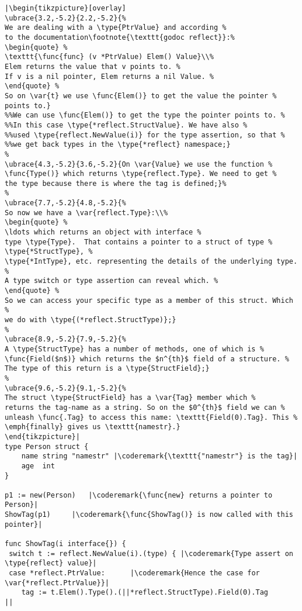 \begin{lstlisting}[caption=Introspection using reflection,label=src:introspection]
|\begin{tikzpicture}[overlay]
\ubrace{3.2,-5.2}{2.2,-5.2}{%
We are dealing with a \type{PtrValue} and according %
to the documentation\footnote{\texttt{godoc reflect}}:%
\begin{quote} %
\texttt{\func{func} (v *PtrValue) Elem() Value}\\%
Elem returns the value that v points to. %
If v is a nil pointer, Elem returns a nil Value. %
\end{quote} %
So on \var{t} we use \func{Elem()} to get the value the pointer %
points to.}
%%We can use \func{Elem()} to get the type the pointer points to. %
%%In this case \type{*reflect.StructValue}. We have also %
%%used \type{reflect.NewValue(i)} for the type assertion, so that %
%%we get back types in the \type{*reflect} namespace;}
%
\ubrace{4.3,-5.2}{3.6,-5.2}{On \var{Value} we use the function %
\func{Type()} which returns \type{reflect.Type}. We need to get %
the type because there is where the tag is defined;}%
%
\ubrace{7.7,-5.2}{4.8,-5.2}{%
So now we have a \var{reflect.Type}:\\%
\begin{quote} %
\ldots which returns an object with interface %
type \type{Type}.  That contains a pointer to a struct of type %
\type{*StructType}, %
\type{*IntType}, etc. representing the details of the underlying type. %
A type switch or type assertion can reveal which. %
\end{quote} %
So we can access your specific type as a member of this struct. Which %
we do with \type{(*reflect.StructType)};}
%
\ubrace{8.9,-5.2}{7.9,-5.2}{%
A \type{StructType} has a number of methods, one of which is %
\func{Field($n$)} which returns the $n^{th}$ field of a structure. %
The type of this return is a \type{StructField};}
%
\ubrace{9.6,-5.2}{9.1,-5.2}{%
The struct \type{StructField} has a \var{Tag} member which %
returns the tag-name as a string. So on the $0^{th}$ field we can %
unleash \func{.Tag} to access this name: \texttt{Field(0).Tag}. This %
\emph{finally} gives us \texttt{namestr}.}
\end{tikzpicture}|
type Person struct {
    name string "namestr" |\coderemark{\texttt{"namestr"} is the tag}|
    age  int
}

p1 := new(Person)   |\coderemark{\func{new} returns a pointer to Person}|
ShowTag(p1)	    |\coderemark{\func{ShowTag()} is now called with this pointer}|

func ShowTag(i interface{}) {
 switch t := reflect.NewValue(i).(type) { |\coderemark{Type assert on \type{reflect} value}|
 case *reflect.PtrValue:	  |\coderemark{Hence the case for \var{*reflect.PtrValue}}|
	tag := t.Elem().Type().(||*reflect.StructType).Field(0).Tag
||
\end{lstlisting}
